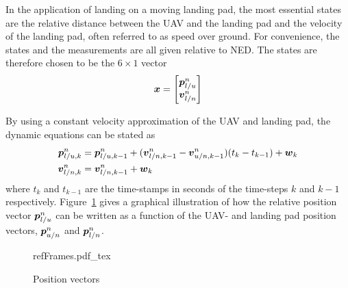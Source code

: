 In the application of landing on a moving landing pad, the most essential states are the relative distance between the UAV and the landing pad and the velocity of the landing pad, often referred to as speed over ground. For convenience, the states and the measurements are all given relative to NED. The states are therefore chosen to be the $6\times1$ vector
\begin{equation}\label{eq:states_pos}
    \boldsymbol{x}
    =
    \begin{bmatrix}
        \boldsymbol{p}^{n}_{l/u}\\
        \boldsymbol{v}^{n}_{l/n}
    \end{bmatrix}
\end{equation}

By using a constant velocity approximation of the UAV and landing pad, the dynamic equations can be stated as
\begin{align}\label{eq:dyn_eq_pos}
    \boldsymbol{p}^{n}_{l/u,k}&=\boldsymbol{p}^{n}_{l/u,k-1}+(\boldsymbol{v}^{n}_{l/n,k-1}-\boldsymbol{v}^{n}_{u/n,k-1})(t_{k}-t_{k-1})+\boldsymbol{w}_k\\
    \boldsymbol{v}^{n}_{l/n,k}&=\boldsymbol{v}^{n}_{l/n,k-1}+\boldsymbol{w}_k
\end{align}
where $t_k$ and $t_{k-1}$ are the time-stamps in seconds of the time-steps $k$ and $k-1$ respectively. Figure~\ref{fig:posVect} gives a graphical illustration of how the relative position vector $\boldsymbol{p}^{n}_{l/u}$ can be written as a function of the UAV- and landing pad position vectors, $\boldsymbol{p}^{n}_{u/n}$ and $\boldsymbol{p}^{n}_{l/n}$.
\begin{figure}[ht]
    \centering
    \def\svgwidth{.5\columnwidth}
    {refFrames.pdf_tex}
    \caption{Position vectors}
    \label{fig:posVect}
\end{figure}

